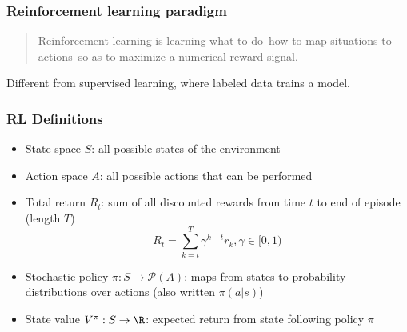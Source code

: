 \documentclass{beamer}
\begin{document}
\begin{frame}
\frametitle{Reinforcement learning paradigm}

\begin{quote}
    Reinforcement learning is learning what to do--how to map situations to actions--so as to maximize a numerical reward signal. \cite{sutton2018reinforcement}
\end{quote}

\begin{figure}
    \centering
    \label{fig:RL}
\end{figure}

Different from supervised learning, where labeled data trains a model.


\end{frame}

\begin{frame}
\frametitle{RL Definitions}

\begin{itemize}
    \item State space $S$: all possible states of the environment
    \item Action space $A$: all possible actions that can be performed
    \item Total return $R_t$: sum of all discounted rewards from time $t$ to end of episode (length $T$)
    \begin{equation}\label{eq:return}
        R_t = \sum_{k=t}^T \gamma^{k-t} r_k, \gamma \in [0,1)
    \end{equation}
    \pause
    \item Stochastic policy $\pi: S \to \mathcal{P}(A)$:
        maps from states to probability distributions over actions (also written $\pi(a|s)$)
    \item State value $V^\pi:S \to \R$: expected return from state following policy $\pi$
\end{itemize}

\end{frame}
\end{document}
